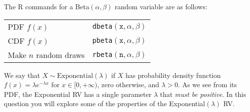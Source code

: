 \documentclass[addpoints,12pt]{exam}
\begin{document}
\begin{questions}
The R commands for a Beta$(\alpha, \beta)$ random variable are as follows:
\begin{center}
  \begin{tabular}[h]{ll}
    PDF $f(x)$ & \texttt{dbeta}$(\texttt{x}, \alpha, \beta)$\\
    CDF $f(x)$ & \texttt{pbeta}$(\texttt{x}, \alpha, \beta)$\\
    Make $n$ random draws & \texttt{rbeta}$(\texttt{n}, \alpha, \beta)$
  \end{tabular}
\end{center}


\question We say that $X \sim \text{Exponential}(\lambda)$ if $X$ has probability density function $f(x) = \lambda e^{-\lambda x}$ for $x \in [0, +\infty)$, zero otherwise, and $\lambda > 0$.
  As we see from its PDF, the Exponential RV has a single parameter $\lambda$ that \emph{must be positive}. 
  In this question you will explore some of the properties of the Exponential$(\lambda)$ RV.
\end{questions}
\end{document}
